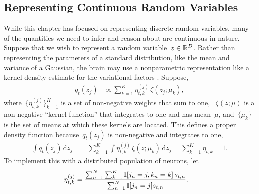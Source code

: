 \subsection{Representing Continuous Random Variables}
While this chapter has focused on representing discrete random variables,
many of the quantities we need to infer and reason about are continuous
in nature. 
Suppose that we wish to represent a random variable~$z \in \mathbb{R}^D$.
Rather than representing the parameters of a standard distribution, like the
mean and variance of a Gaussian, the brain may use a nonparametric
representation like a kernel density estimate for the variational factors
\cite{Anderson1994, Barber2003}.
Suppose,
\begin{align*}
  q_t(z_j) &\propto
  \sum_{k=1}^K \eta_{t,k}^{(j)} \, \zeta(z_j; \mu_k),
\end{align*}
where~$\{\eta_{t,k}^{(j)}\}_{k=1}^K$ is a set of non-negative weights that
sum to one, ~$\zeta(z; \mu)$ is a non-negative ``kernel function''
that integrates to one and has mean~$\mu$, and~$\{\mu_k\}$ is the set of
means at which these kernels are located. This defines a proper
density function because~$q_t(z_j)$ is non-negative and integrates to one,
\begin{align*}
  \int q_t(z_j) \, \mathrm{d}z_j &=
  \sum_{k=1}^K  \int \eta_{t,k}^{(j)} \, \zeta(z; \mu_k) \, \mathrm{d}z_j
  = \sum_{k=1}^K \eta_{t,k} = 1.
\end{align*}
To implement this with a distributed population of neurons, let
\begin{align*}
  \eta_{t,k}^{(j)} &=
  \frac{\sum_{n=1}^N \sum_{k=1}^K \mathbb{I}[j_n=j, k_n=k] \, s_{t,n}}
       {\sum_{n=1}^N \mathbb{I}[j_n=j] s_{t,n}}.
\end{align*}

